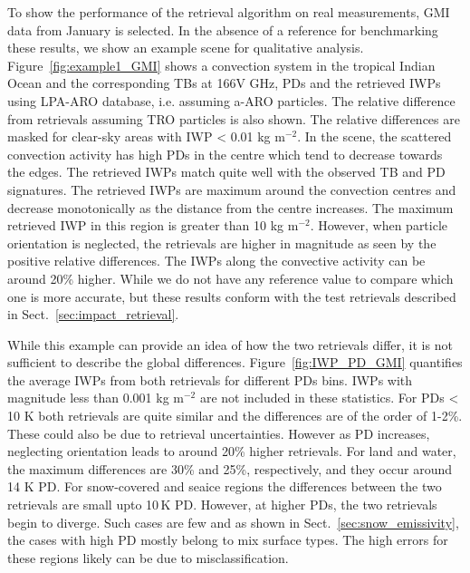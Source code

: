 \documentclass[amt, manuscript]{copernicus}
\begin{document}
To show the performance of the retrieval algorithm on real measurements, GMI data from January is selected. In the absence of a reference for benchmarking these results, we show an example scene for qualitative analysis. Figure~\ref{fig:example1_GMI} shows a convection system in the tropical Indian Ocean and the corresponding TBs at 166V GHz, PDs and the retrieved IWPs using LPA-ARO database, i.e. assuming a-ARO particles. The relative difference from retrievals assuming TRO particles is also shown. The relative differences are masked for clear-sky areas with IWP < 0.01 kg m$^{-2}$. In the scene, the scattered convection activity has high PDs in the centre which tend to decrease towards the edges. The retrieved IWPs match quite well with the observed TB and PD signatures. The retrieved IWPs are maximum around the convection centres and decrease monotonically as the distance from the centre increases. The maximum retrieved IWP in this region is greater than 10\,\,kg m$^{-2}$. However, when particle orientation is neglected, the retrievals are higher in magnitude as seen by the positive relative differences. The IWPs along the convective activity can be around 20\% higher. While we do not have any reference value to compare which one is more accurate, but these results conform with the test retrievals described in  Sect.~\ref{sec:impact_retrieval}.


																																				While this example can provide an idea of how the two retrievals differ, it is not sufficient to describe the global differences. Figure~\ref{fig:IWP_PD_GMI} quantifies the average IWPs from both retrievals for different PDs bins. IWPs with magnitude less than 0.001\,\,kg m$^{-2}$ are not included in these statistics. For PDs < 10\,\,K both retrievals are quite similar and the differences are of the order of 1-2\%. These could also be due to retrieval uncertainties. However as PD increases, neglecting orientation leads to around 20\% higher retrievals. For land and water, the maximum differences are 30\%  and 25\%, respectively, and they occur around 14\,\,K PD. For snow-covered and seaice regions the differences between the two retrievals are small upto 10\,K PD. However, at higher PDs, the two retrievals begin to diverge. Such cases are few and as shown in Sect.~\ref{sec:snow_emissivity}, the cases with high PD mostly belong to mix surface types. The high errors for these regions likely can be due to misclassification.
\end{document}
